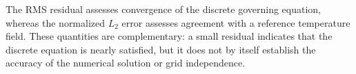 The RMS residual assesses convergence of the discrete governing
equation, whereas the normalized $L_2$ error assesses agreement
with a reference temperature field. These quantities are
complementary: a small residual indicates that the discrete
equation is nearly satisfied, but it does not by itself establish
the accuracy of the numerical solution or grid independence.

